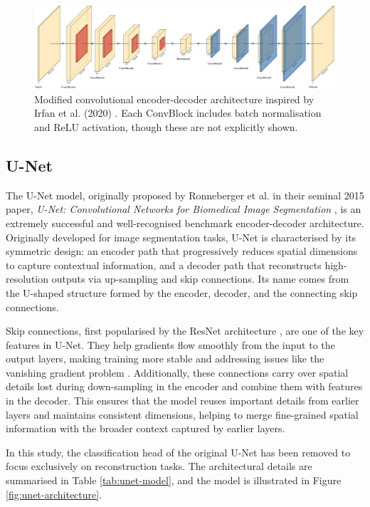 \begin{figure}
    \centering
    \includegraphics[width=\linewidth]{img/ch6/architectures/irfan.pdf}
    \caption{Modified convolutional encoder-decoder architecture inspired by Irfan et al. (2020) \cite{brito-loeza_novel_2020}. Each ConvBlock includes batch normalisation and ReLU activation, though these are not explicitly shown.}
    \label{fig:irfan2020-architecture}
\end{figure}

\subsection{U-Net}\label{subsec:unet}

The U-Net model, originally proposed by Ronneberger et al. in their seminal 2015 paper, \textit{U-Net: Convolutional Networks for Biomedical Image Segmentation} \cite{ronneberger_u-net_2015}, is an extremely successful and well-recognised benchmark encoder-decoder architecture. Originally developed for image segmentation tasks, U-Net is characterised by its symmetric design: an encoder path that progressively reduces spatial dimensions to capture contextual information, and a decoder path that reconstructs high-resolution outputs via up-sampling and skip connections. Its name comes from the U-shaped structure formed by the encoder, decoder, and the connecting skip connections.

Skip connections, first popularised by the ResNet architecture \cite{he_deep_2015}, are one of the key features in U-Net. They help gradients flow smoothly from the input to the output layers, making training more stable and addressing issues like the vanishing gradient problem \cite{adaloglou_intuitive_2020}. Additionally, these connections carry over spatial details lost during down-sampling in the encoder and combine them with features in the decoder. This ensures that the model reuses important details from earlier layers and maintains consistent dimensions, helping to merge fine-grained spatial information with the broader context captured by earlier layers.

In this study, the classification head of the original U-Net has been removed to focus exclusively on reconstruction tasks. The architectural details are summarised in Table \ref{tab:unet-model}, and the model is illustrated in Figure \ref{fig:unet-architecture}.

